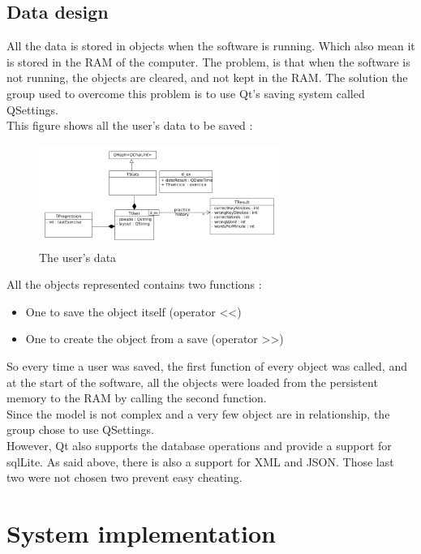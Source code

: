 \chapter{Data design}
All the data is stored in objects when the software is running. Which also mean it is stored in the RAM of the computer.
The problem, is that when the software is not running, the objects are cleared, and not kept in the RAM. The solution the group used to overcome this problem is to use Qt's saving system called QSettings.\\
This figure shows all the user's data to be saved :

\begin{figure}[H]
	\centering
	\includegraphics[width=0.7\textwidth]{images/diagram-data.png}
	 \caption{The user's data}
	 \label{diagram-data}
\end{figure}

All the objects represented contains two functions :
\begin{itemize}
	\item One to save the object itself (operator <<)
	\item One to create the object from a save (operator >>)
\end{itemize}

So every time a user was saved, the first function of every object was called, and at the start of the software, all the objects were loaded from the persistent memory to the RAM by calling the second function.\\
Since the model is not complex and a very few object are in relationship, the group chose to use QSettings. \\
However, Qt also supports the database operations and provide a support for sqlLite. As said above, there is also a support for XML and JSON. Those last two were not chosen two prevent easy cheating.


\part{System implementation}

